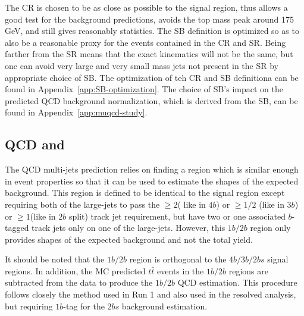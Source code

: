 The CR is chosen to be as close as possible to the signal region, thus allows a good test for the background predictions, avoids the top mass peak around 175 GeV, and still gives reasonably statistics.  The SB definition is optimized so as to also be a reasonable proxy for the events contained in the CR and SR. Being farther from the SR means that the exact kinematics will not be the same, but one can avoid very large and very small mass jets not present in the SR by appropriate choice of SB.   The optimization of teh CR and SB definitiona can be found in Appendix~\ref{app:SB-optimization}. The choice of SB's impact on the predicted QCD background normalization, which is derived from the SB, can be found in Appendix~\ref{app:muqcd-study}.


\pagebreak{}
\subsection{QCD and \ttbar}
\label{sec:boosted-qcd}

The QCD multi-jets prediction relies on finding a region which is similar enough in event properties so that it can be used to estimate the shapes of the expected background. This region is defined to be identical to the signal region except requiring both of the large-\R jets to pass the $\geq 2$( like in $4b$) or $\geq 1/2$ (like in $3b$) or $\geq 1$(like in $2b$ split) track jet requirement, but have two or one associated $b$-tagged track jets only on one of the large-\R jets. However, this $1b/2b$ region only provides shapes of the expected background and not the total yield. 

It should be noted that the $1b/2b$ region is orthogonal to the $4b/3b/2bs$ signal regions. In addition, the MC predicted $t\bar{t}$ events in the $1b/2b$ regions are subtracted from the data to produce the $1b/2b$ QCD estimation. This procedure follows closely the method used in Run 1 and also used in the resolved analysis, but requiring $1b$-tag for the $2bs$ background estimation.


